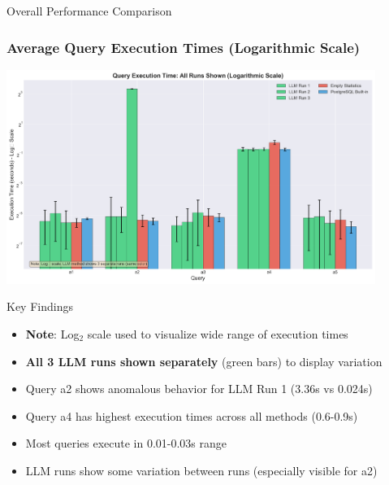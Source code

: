 \documentclass{beamer}
\begin{document}
\begin{frame}{Overall Performance Comparison}
\frametitle{Average Query Execution Times (Logarithmic Scale)}

\begin{center}
\includegraphics[width=0.9\textwidth]{images/execution_time_comparison.png}
\end{center}

\begin{block}{Key Findings}
\begin{itemize}
    \item \textbf{Note}: Log$_2$ scale used to visualize wide range of execution times
    \item \textbf{All 3 LLM runs shown separately} (green bars) to display variation
    \item Query a2 shows anomalous behavior for LLM Run 1 (3.36s vs 0.024s)
    \item Query a4 has highest execution times across all methods (0.6-0.9s)
    \item Most queries execute in 0.01-0.03s range
    \item LLM runs show some variation between runs (especially visible for a2)
\end{itemize}
\end{block}


\end{frame}
\end{document}
